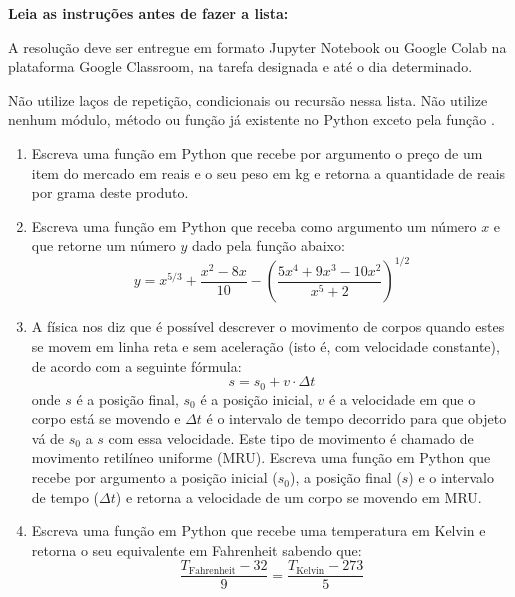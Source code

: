 
\vspace{1cm}

\noindent  \textbf{Leia as instruções antes de fazer a lista:}

\vspace{0.3cm}
\noindent A resolução deve ser entregue em formato Jupyter Notebook ou Google Colab na plataforma Google Classroom, na tarefa designada e até o dia determinado.

\noindent  Não utilize laços de repetição, condicionais ou recursão nessa lista. Não utilize nenhum módulo, método ou função já existente no Python exceto pela função . 

\vspace{0.5cm}


\begin{enumerate}[label=\textbf{Q\arabic*.}]
    \item Escreva uma função em Python que recebe por argumento o preço de um item do mercado em reais e o seu peso em kg e retorna a quantidade de reais por grama deste produto.

    


    \item Escreva uma função em Python que receba como argumento um número $x$ e que retorne um número $y$ dado pela função abaixo:
    \[
    y = x^{5/3} + \frac{x^2 - 8x}{10} - \left( \frac{5x^4 + 9x^3 - 10x^2}{x^5 + 2} \right)^{1/2}
    \]
    
    

    \item A física nos diz que é possível descrever o movimento de corpos quando estes se movem em linha reta e sem aceleração (isto é, com velocidade constante), de acordo com a seguinte fórmula:
    \[
    s = s_0 + v \cdot \Delta t
    \]
    onde $s$ é a posição final, $s_0$ é a posição inicial, $v$ é a velocidade em que o corpo está se movendo e $\Delta t$ é o intervalo de tempo decorrido para que objeto vá de $s_0$ a $s$ com essa velocidade. Este tipo de movimento é chamado de movimento retilíneo uniforme (MRU). Escreva uma função em Python que recebe por argumento a posição inicial ($s_0$), a posição final ($s$) e o intervalo de tempo ($\Delta t$) e retorna a velocidade de um corpo se movendo em MRU.

    


    \item Escreva uma função em Python que recebe uma temperatura em Kelvin e retorna o seu equivalente em Fahrenheit sabendo que:
    \[
    \frac{T_{\text{Fahrenheit}} - 32}{9} = \frac{T_{\text{Kelvin}} - 273}{5}
    \]


\end{enumerate}
